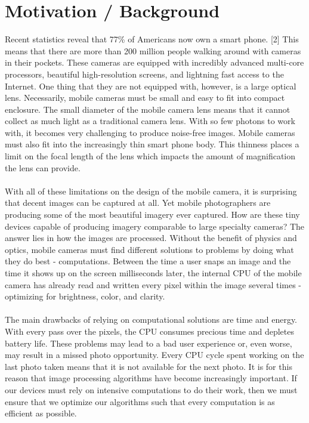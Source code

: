 \documentclass{article} %
\begin{document}
\section{Motivation / Background}
Recent statistics reveal that 77\% of Americans now own a smart phone. [2] This means that there are more than 200 million people walking around with cameras in their pockets. These cameras are equipped with incredibly advanced multi-core processors, beautiful high-resolution screens, and lightning fast access to the Internet.  One thing that they are not equipped with, however, is a large optical lens.  Necessarily, mobile cameras must be small and easy to fit into compact enclosure. The small diameter of the mobile camera lens means that it cannot collect as much light as a traditional camera lens. With so few photons to work with, it becomes very challenging to produce noise-free images.  Mobile cameras must also fit into the increasingly thin smart phone body.  This thinness places a limit on the focal length of the lens which impacts the amount of magnification the lens can provide.  \\
\\
With all of these limitations on the design of the mobile camera, it is surprising that decent images can be captured at all.  Yet mobile photographers are producing some of the most beautiful imagery ever captured.  How are these tiny devices capable of producing imagery comparable to large specialty cameras? The answer lies in how the images are processed.  Without the benefit of physics and optics, mobile cameras must find different solutions to problems by doing what they do best - computations.  Between the time a user snaps an image and the time it shows up on the screen milliseconds later, the internal CPU of the mobile camera has already read and written every pixel within the image several times - optimizing for brightness, color, and clarity. \\
\\
The main drawbacks of relying on computational solutions are time and energy.  With every pass over the pixels, the CPU consumes precious time and depletes battery life. These problems may lead to a bad user experience or, even worse, may result in a missed photo opportunity. Every CPU cycle spent working on the last photo taken means that it is not available for the next photo.  It is for this reason that image processing algorithms have become increasingly important. If our devices must rely on intensive computations to do their work, then we must ensure that we optimize our algorithms such that every computation is as efficient as possible.  \\
\end{document}

